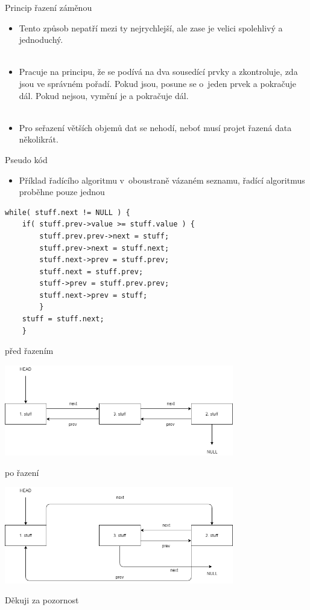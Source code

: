 \documentclass[11pt]{beamer}
\begin{document}
\begin{frame}{Princip řazení záměnou}
\begin{itemize}
    \item Tento způsob nepatří mezi ty nejrychlejší, ale zase je velici spolehlivý a jednoduchý.\\
    \
    
    \item Pracuje na principu, že se podívá na dva sousedící prvky a zkontroluje, zda jsou ve správném pořadí. Pokud jsou, posune se o~jeden prvek a pokračuje dál. Pokud nejsou, vymění je a pokračuje dál.\\
    \
    
    \item Pro seřazení větších objemů dat se nehodí, neboť musí projet řazená data několikrát.
\end{itemize}
\end{frame}


\begin{frame}[fragile]{Pseudo kód}
\begin{itemize}
    \item Příklad řadícího algoritmu v~oboustraně vázaném seznamu, řadící algoritmus proběhne pouze jednou
\end{itemize}
\begin{lstlisting}[basicstyle=\scriptsize]
while( stuff.next != NULL ) {
    if( stuff.prev->value >= stuff.value ) {
        stuff.prev.prev->next = stuff;
        stuff.prev->next = stuff.next;
        stuff.next->prev = stuff.prev;
        stuff.next = stuff.prev;
        stuff->prev = stuff.prev.prev;
        stuff.next->prev = stuff;
        }
    stuff = stuff.next;
    }

\end{lstlisting}
\end{frame}

\begin{frame}{před řazením}

 \includegraphics[width=10cm]{proj5_1.png}
 
\end{frame}

\begin{frame}{po řazení}
    
\includegraphics[width=10cm]{proj5_2.png}
    
\end{frame}

\begin{frame}{Děkuji za pozornost}
    
\end{frame}
 
\end{document}
